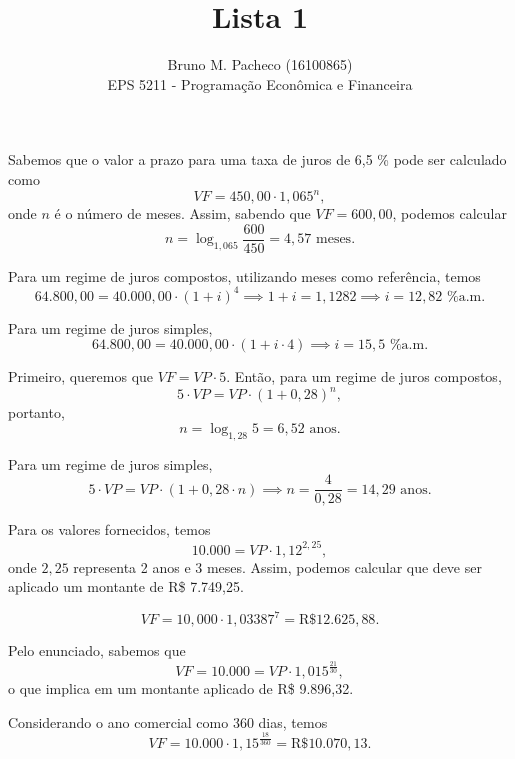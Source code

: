 \documentclass[a4paper]{report}
\begin{document}
 
\title{Lista 1}
\author{Bruno M. Pacheco (16100865)\\
EPS 5211 - Programação Econômica e Financeira}
 
\maketitle
 

Sabemos que o valor a prazo para uma taxa de juros de 6,5 \% pode ser calculado como \[
VF = 450,00 \cdot 1,065 ^{n}
,\] onde $n$ é o número de meses. Assim, sabendo que $VF=600,00$, podemos calcular \[
n = \log_{1,065} \frac{600}{450} = 4,57 \text{ meses}
.\] 


Para um regime de juros compostos, utilizando meses como referência, temos \[
64.800,00 = 40.000,00 \cdot \left( 1+i \right)  ^{4} \implies 1+i = 1,1282 \implies i = 12,82 \text{ \% a.m.}
\] 

Para um regime de juros simples, \[
64.800,00 = 40.000,00 \cdot \left( 1 + i \cdot 4 \right)  \implies  i = 15,5\text{ \% a.m.}
\] 


Primeiro, queremos que $VF = VP \cdot 5$. Então, para um regime de juros compostos, \[
5\cdot VP = VP \cdot \left( 1+0,28 \right) ^{n}
,\] portanto, \[
n = \log_{1,28}5 = 6,52\text{ anos}
.\] 

Para um regime  de juros simples, \[
    5 \cdot  VP = VP \cdot \left( 1 + 0,28\cdot n \right) \implies n = \frac{4}{0,28} = 14,29\text{ anos}
.\] 


Para os valores fornecidos, temos \[
10.000 = VP \cdot 1,12 ^{2,25}
,\] onde $2,25$ representa 2 anos e 3 meses. Assim, podemos calcular que deve ser aplicado um montante de R\$ 7.749,25.


\[
VF = 10,000 \cdot 1,03387 ^{7} = \text{R\$ }12.625,88
.\] 


Pelo enunciado, sabemos que \[
VF = 10.000 = VP \cdot 1,015^{\frac{21}{30}}
,\] o que implica em um montante aplicado de R\$ 9.896,32.


Considerando o ano comercial como 360 dias, temos \[
VF = 10.000 \cdot 1,15^{\frac{18}{360}} = \text{R\$ }10.070,13
.\] 

\end{document}
